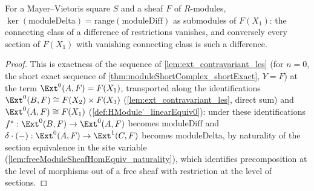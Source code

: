 \begin{lemma}[Exactness at \(F(X_1)\)]
  \label{lem:mv_exact_at_X1}
  \leanok
  For a Mayer--Vietoris square \(S\) and a sheaf \(F\) of \(R\)-modules,
  \(\ker(\mathrm{moduleDelta}) = \mathrm{range}(\mathrm{moduleDiff})\) as submodules of
  \(F(X_1)\): the connecting class of a difference of restrictions vanishes, and conversely
  every section of \(F(X_1)\) with vanishing connecting class is such a difference.
\end{lemma}
\begin{proof}
  \leanok
  This is exactness of the sequence of \ref{lem:ext_contravariant_les} (for \(n=0\), the
  short exact sequence of \ref{thm:moduleShortComplex_shortExact}, \(Y=F\)) at the term
  \(\Ext^0(A,F) = F(X_1)\), transported along the identifications
  \(\Ext^0(B,F) \cong F(X_2) \times F(X_3)\) (\ref{lem:ext_contravariant_les}, direct sum) and
  \(\Ext^0(A,F) \cong F(X_1)\) (\ref{def:HModule'_linearEquiv0}): under these identifications
  \(f^* : \Ext^0(B,F) \to \Ext^0(A,F)\) becomes \(\mathrm{moduleDiff}\) and
  \(\delta \cdot (-) : \Ext^0(A,F) \to \Ext^1(C,F)\) becomes \(\mathrm{moduleDelta}\), by
  naturality of the section equivalence in the site variable
  (\ref{lem:freeModuleSheafHomEquiv_naturality}), which identifies precomposition at the
  level of morphisms out of a free sheaf with restriction at the level of sections.
\end{proof}

